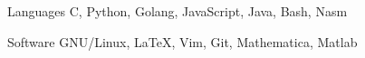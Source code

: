 
\begin{cvskills}
  \cvskill
    {Languages} %
    {C, Python, Golang, JavaScript, Java, Bash, Nasm} %

  \cvskill
    {Software} %
    {GNU/Linux, LaTeX, Vim, Git, Mathematica, Matlab} %
\end{cvskills}

